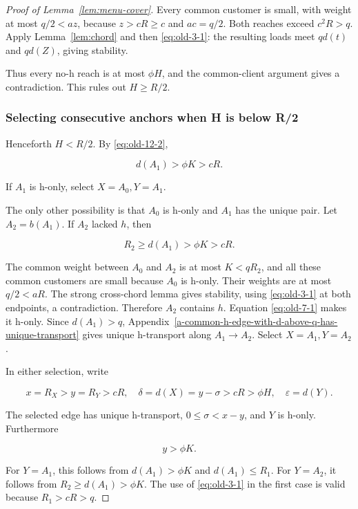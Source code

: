 \documentclass[11pt]{amsart}
\numberwithin{equation}{section}
\theoremstyle{definition}
\begin{document}
\begin{proof}[Proof of Lemma~\ref{lem:menu-cover}]
Every common customer is small, with weight at most \(q/2<a z\), because \(z>cR\ge c\) and \(ac=q/2\). Both reaches exceed \(c^2R>q\). Apply Lemma~\ref{lem:chord} and then \eqref{eq:old-3-1}: the resulting loads meet \(qd(t)\) and \(qd(Z)\), giving stability.

Thus every no-h reach is at most \(\phi H\), and the common-client argument gives a contradiction. This rules out \(H\ge R/2\).


\subsubsection{Selecting consecutive anchors when H is below R/2}\label{selecting-consecutive-anchors-when-h-is-below-r2}

Henceforth \(H<R/2\). By \eqref{eq:old-12-2},

\begin{equation}
d(A_1)>\phi K>cR. \label{eq:old-12-4}
\end{equation}

If \(A_1\) is h-only, select \(X=A_0,Y=A_1\).

The only other possibility is that \(A_0\) is h-only and \(A_1\) has the unique pair. Let \(A_2=b(A_1)\). If \(A_2\) lacked \(h\), then

\[
R_2\ge d(A_1)>\phi K>cR.
\]

The common weight between \(A_0\) and \(A_2\) is at most \(K<qR_2\), and all these common customers are small because \(A_0\) is h-only. Their weights are at most \(q/2<aR\). The strong cross-chord lemma gives stability, using \eqref{eq:old-3-1} at both endpoints, a contradiction. Therefore \(A_2\) contains \(h\). Equation \eqref{eq:old-7-1} makes it h-only. Since \(d(A_1)>q\), Appendix~\ref{a-common-h-edge-with-d-above-q-has-unique-transport} gives unique h-transport along \(A_1\to A_2\). Select \(X=A_1,Y=A_2\).

In either selection, write

\[
x=R_X>y=R_Y>cR,\quad \delta=d(X)=y-\sigma>cR>\phi H,
\quad \varepsilon=d(Y).
\]

The selected edge has unique h-transport, \(0\le\sigma<x-y\), and \(Y\) is h-only. Furthermore

\begin{equation}
y>\phi K. \label{eq:old-12-5}
\end{equation}

For \(Y=A_1\), this follows from \(d(A_1)>\phi K\) and \(d(A_1)\le R_1\). For \(Y=A_2\), it follows from \(R_2\ge d(A_1)>\phi K\). The use of \eqref{eq:old-3-1} in the first case is valid because \(R_1>cR>q\).



\end{proof}
\end{document}
